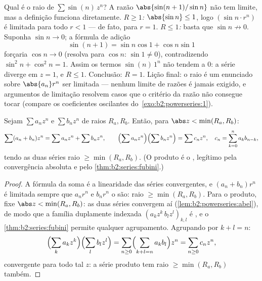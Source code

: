 \begin{example}\label{ex:b2:powerseries:sinn}
Qual é o raio de $\sum \sin(n)\,z^n$? A razão
$\abs{\sin(n+1)/\sin n}$ não tem limite, mas a definição funciona
diretamente. \emph{$R \geq 1$:} $\abs{\sin n} \leq 1$, logo $(\sin
n\cdot r^n)$ é limitada para todo $r < 1$ --- de fato, para $r =
1$. \emph{$R \leq 1$:} basta que $\sin n \not\to 0$.
Suponha $\sin n \to 0$; a fórmula de adição
\[
\sin(n+1) = \sin n\cos 1 + \cos n\sin 1
\]
forçaria $\cos n \to 0$ (resolva para $\cos n$: $\sin 1 \neq
0$), contradizendo $\sin^2 n + \cos^2 n = 1$. Assim os termos
$\sin(n)\,1^n$ não tendem a $0$: a série diverge em $z =
1$, e $R \leq 1$. Conclusão: $R = 1$. Lição final: o
raio é um enunciado sobre $\abs{a_n}r^n$ ser limitada ---
nenhum limite de razões é jamais exigido, e argumentos de limitação
resolvem casos que o critério da razão não consegue tocar (compare os
coeficientes oscilantes do~\cref{exo:b2:powerseries:1}).
\end{example}

\begin{proposition}[Operações]\label{prop:b2:powerseries:operations}
Sejam $\sum a_nz^n$ e $\sum b_nz^n$ de raios $R_a, R_b$. Então, para
$\abs z < \min(R_a, R_b)$:
\[
\sum (a_n + b_n)z^n = \sum a_nz^n + \sum b_nz^n,
\qquad
\Bigl(\sum a_nz^n\Bigr)\Bigl(\sum b_nz^n\Bigr) = \sum c_n z^n,
\quad c_n = \sum_{k=0}^{n} a_kb_{n-k},
\]
tendo as duas séries raio $\geq \min(R_a, R_b)$. (O produto é o
, legítimo pela convergência absoluta e pelo
\cref{thm:b2:series:fubini}.)
\end{proposition}

\begin{proof}
A fórmula da soma é a linearidade das séries convergentes, e
$(a_n + b_n)r^n$ é limitada sempre que $a_nr^n$ e $b_nr^n$
o são: raio $\geq \min(R_a, R_b)$. Para o produto, fixe $\abs z
< \min(R_a, R_b)$: as duas séries convergem \emph{}
aí (\cref{lem:b2:powerseries:abel}), de modo que a família duplamente indexada
$(a_kz^k\,b_lz^l)_{k,l}$ é , e o
\cref{thm:b2:series:fubini} permite qualquer agrupamento. Agrupando por $k
+ l = n$:
\[
\Bigl(\sum_k a_kz^k\Bigr)\Bigl(\sum_l b_lz^l\Bigr)
= \sum_{n\geq0}\Bigl(\sum_{k+l=n}a_kb_l\Bigr)z^n
= \sum_{n\geq0}c_nz^n ,
\]
 convergente para todo tal $z$: a série produto
tem raio $\geq \min(R_a, R_b)$ também.
\end{proof}

